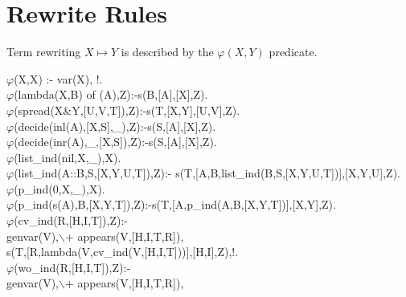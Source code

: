 \documentclass[11pt]{report}
\makeatletter
\newcommand{\ulinv}[1]{\index{#1@\texttt{#1}}}
\makeatother
\begin{document}
 \section{Rewrite Rules}
 Term rewriting $X \mapsto Y$ is described by the $\varphi(X,Y)$ predicate.
 \ulinv{rewrite}
\begin{sf}\begin{tabbing}
$\varphi$(X,X) :- var(X), !.\\[-0.15ex]
$\varphi$(lambda(X,B) of (A),Z):-s(B,[A],[X],Z).\\[-0.15ex]
$\varphi$(spread(X\&Y,[U,V,T]),Z):-s(T,[X,Y],[U,V],Z).\\[-0.15ex]
$\varphi$(decide(inl(A),[X,S],\_\hspace{0.1em}),Z):-s(S,[A],[X],Z).\\[-0.15ex]
$\varphi$(decide(inr(A),\_\hspace{0.1em},[X,S]),Z):-s(S,[A],[X],Z).\\[-0.15ex]
$\varphi$(list\_\hspace{0.1em}ind(nil,X,\_\hspace{0.1em}),X).\\[-0.15ex]
$\varphi$(list\_\hspace{0.1em}ind(A::B,S,[X,Y,U,T]),Z):- s(T,[A,B,list\_\hspace{0.1em}ind(B,S,[X,Y,U,T])],[X,Y,U],Z).\\[-0.15ex]
$\varphi$(p\_\hspace{0.1em}ind(0,X,\_\hspace{0.1em}),X).\\[-0.15ex]
$\varphi$(p\_\hspace{0.1em}ind(s(A),B,[X,Y,T]),Z):-s(T,[A,p\_\hspace{0.1em}ind(A,B,[X,Y,T])],[X,Y],Z).\\[-0.15ex]
$\varphi$(cv\_\hspace{0.1em}ind(R,[H,I,T]),Z):-\\[-0.15ex]
\hspace{2em}genvar(V),$\backslash$+ appears(V,[H,I,T,R]),\\[-0.15ex]
\hspace{2em}s(T,[R,lambda(V,cv\_\hspace{0.1em}ind(V,[H,I,T]))],[H,I],Z),!.\\[-0.15ex]
$\varphi$(wo\_\hspace{0.1em}ind(R,[H,I,T]),Z):-\\[-0.15ex]
\hspace{2em}genvar(V),$\backslash$+ appears(V,[H,I,T,R]),\\[-0.15ex]

\end{tabbing}
\end{sf}
\end{document}
